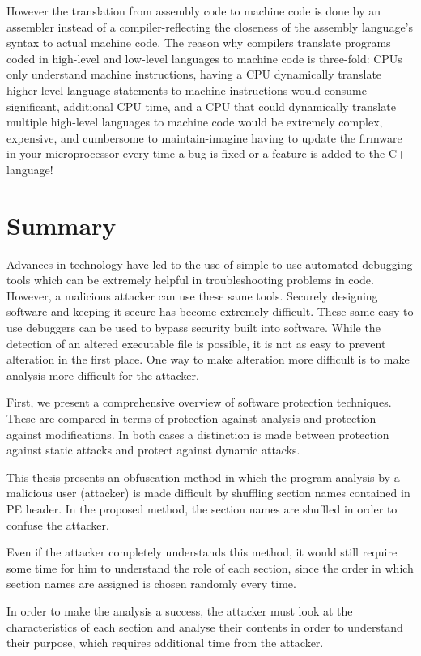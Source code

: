 \documentclass[a4paper,12pt]{article}
\begin{document}
However the translation from assembly code to machine
code is done by an assembler instead of a compiler-reflecting the closeness
of the assembly language's syntax to actual machine code. The reason why
compilers translate programs coded in high-level and low-level languages to
machine code is three-fold: CPUs only understand machine instructions, having
a CPU dynamically translate higher-level language statements to machine
instructions would consume significant, additional CPU time, and a CPU
that could dynamically translate multiple high-level languages to machine
code would be extremely complex, expensive, and cumbersome to
maintain-imagine having to update the firmware in your microprocessor every
time a bug is fixed or a feature is added to the C++ language!

\section{Summary}
Advances in technology have led to the use of simple to use automated
debugging tools which can be extremely helpful in troubleshooting problems in
code. However, a malicious attacker can use these same tools. Securely
designing software and keeping it secure has become extremely difficult.
These same easy to use debuggers can be used to bypass security built into
software. While the detection of an altered executable file is possible, it
is not as easy to prevent alteration in the first place. One way to make
alteration more difficult is to make analysis more difficult for the attacker.

First, we present a comprehensive overview of software protection techniques.
These are compared in terms of protection against analysis and protection
against modifications. In both cases a distinction is made between protection
against static attacks and protect against dynamic attacks.

This thesis presents an obfuscation method in which the program analysis by a
malicious user (attacker) is made difficult by shuffling section names
contained in PE header. In the proposed method, the section names are shuffled
in order to confuse the attacker.

Even if the attacker completely understands this method, it would still require
some time for him to understand the role of each section, since the order in
which section names are assigned is chosen randomly every time.

In order to make the analysis a success, the attacker must look at the
characteristics of each section and analyse their contents in order to
understand their purpose, which requires additional time from the attacker.
\end{document}
